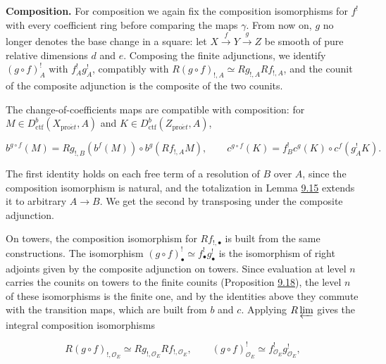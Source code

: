 \documentclass[11pt]{article}
\begin{document}
\label{bp78}%
\textbf{Composition.} For composition we again fix the composition isomorphisms for \(f^!\) with every coefficient ring before comparing the maps \(\gamma\). From now on, \(g\) no longer denotes the base change in a square: let \(X\xrightarrow{f}Y\xrightarrow{g}Z\) be smooth of pure relative dimensions \(d\) and \(e\). Composing the finite adjunctions, we identify \((g\circ f)_A^!\) with \(f_A^!g_A^!\), compatibly with \(R(g\circ f)_{!,A}\simeq Rg_{!,A}Rf_{!,A}\), and the counit of the composite adjunction is the composite of the two counits.

The change-of-coefficients maps are compatible with composition: for \(M\in D^b_{\mathrm{ctf}}(X_{\mathrm{pro}\acute{e}t},A)\) and \(K\in D^b_{\mathrm{ctf}}(Z_{\mathrm{pro}\acute{e}t},A)\),

\[
b^{g\circ f}(M)=Rg_{!,B}(b^f(M))\circ b^g(Rf_{!,A}M),
\qquad
c^{g\circ f}(K)=f_B^!c^g(K)\circ c^f(g_A^!K).
\]

The first identity holds on each free term of a resolution of \(B\) over \(A\), since the composition isomorphism is natural, and the totalization in Lemma \hyperref[bp47]{9.15} extends it to arbitrary \(A\to B\). We get the second by transposing under the composite adjunction.

On towers, the composition isomorphism for \(Rf_{!,\bullet}\) is built from the same constructions. The isomorphism \((g\circ f)^!_\bullet\simeq f^!_\bullet g^!_\bullet\) is the isomorphism of right adjoints given by the composite adjunction on towers. Since evaluation at level \(n\) carries the counits on towers to the finite counits (Proposition \hyperref[bp58]{9.18}), the level \(n\) of these isomorphisms is the finite one, and by the identities above they commute with the transition maps, which are built from \(b\) and \(c\). Applying \(R\varprojlim\) gives the integral composition isomorphisms

\[
R(g\circ f)_{!,\mathcal O_E}\simeq Rg_{!,\mathcal O_E}Rf_{!,\mathcal O_E},
\qquad
(g\circ f)_{\mathcal O_E}^{!}\simeq f_{\mathcal O_E}^{!}g_{\mathcal O_E}^{!},
\]
\end{document}
